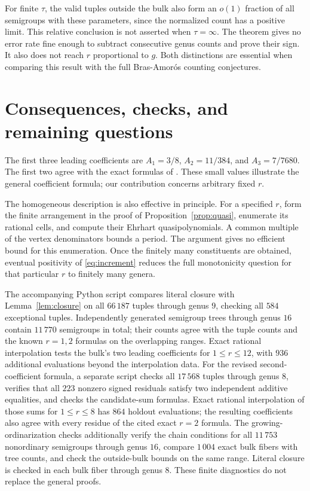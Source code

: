 \documentclass[11pt]{article}
\theoremstyle{remark}\newtheorem{remark}[theorem]{Remark}
\begin{document}
For finite $\tau$, the valid tuples outside the bulk also form an
$o(1)$ fraction of all semigroups with these parameters, since the
normalized count has a positive limit. This relative conclusion is
not asserted when $\tau=\infty$. The theorem gives no error rate fine
enough to subtract consecutive genus counts and prove their sign.
It also does not reach $r$ proportional to $g$. Both distinctions are
essential when comparing this result with the full Bras-Amor\'os
counting conjectures.

\section{Consequences, checks, and remaining questions}
The first three leading coefficients are $A_1=3/8$, $A_2=11/384$, and $A_3=7/7680$. The first two agree with the exact formulas of \cite[Proposition 2.1 and Theorem 3.5]{CK}. These small values illustrate the general coefficient formula; our contribution concerns arbitrary fixed $r$.

The homogeneous description is also effective in principle. For a specified $r$, form the finite arrangement in the proof of Proposition~\ref{prop:quasi}, enumerate its rational cells, and compute their Ehrhart quasipolynomials. A common multiple of the vertex denominators bounds a period. The argument gives no efficient bound for this enumeration. Once the finitely many constituents are obtained, eventual positivity of \eqref{eq:increment} reduces the full monotonicity question for that particular $r$ to finitely many genera.

The accompanying Python script compares literal closure with Lemma~\ref{lem:closure} on all $66\,187$ tuples through genus $9$, checking all $584$ exceptional tuples. Independently generated semigroup trees through genus $16$ contain $11\,770$ semigroups in total; their counts agree with the tuple counts and the known $r=1,2$ formulas on the overlapping ranges. Exact rational interpolation tests the bulk's two leading coefficients for $1\le r\le12$, with $936$ additional evaluations beyond the interpolation data. For the revised second-coefficient formula, a separate script checks all $17\,568$ tuples through genus $8$, verifies that all $223$ nonzero signed residuals satisfy two independent additive equalities, and checks the candidate-sum formulas. Exact rational interpolation of those sums for $1\le r\le8$ has $864$ holdout evaluations; the resulting coefficients also agree with every residue of the cited exact $r=2$ formula. The growing-ordinarization checks additionally verify the chain conditions for all $11\,753$ nonordinary semigroups through genus $16$, compare $1\,004$ exact bulk fibers with tree counts, and check the outside-bulk bounds on the same range. Literal closure is checked in each bulk fiber through genus $8$. These finite diagnostics do not replace the general proofs.
\end{document}
